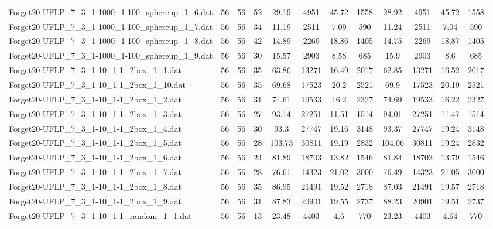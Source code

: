 \begin{sidewaystable}[!ht]
{\begin{tabular}{lccccccccccc}
Forget20-UFLP\_7\_3\_1-1000\_1-100\_sphereup\_1\_6.dat & 56 & 56 & 52 & 29.19 & 4951 & 45.72 & 1558 & 28.92 & 4951 & 45.72 & 1558 \\
Forget20-UFLP\_7\_3\_1-1000\_1-100\_sphereup\_1\_7.dat & 56 & 56 & 34 & 11.19 & 2511 & 7.09 & 590 & 11.24 & 2511 &  \textcolor{blue2}{7.04} & 590 \\
Forget20-UFLP\_7\_3\_1-1000\_1-100\_sphereup\_1\_8.dat & 56 & 56 & 42 & 14.89 & 2269 & 18.86 & 1405 &  \textcolor{blue2}{14.75} & 2269 & 18.87 & 1405 \\
Forget20-UFLP\_7\_3\_1-1000\_1-100\_sphereup\_1\_9.dat & 56 & 56 & 30 & 15.57 & 2903 &  \textcolor{blue2}{8.58} & 685 & 15.9 & 2903 & 8.6 & 685 \\
Forget20-UFLP\_7\_3\_1-10\_1-1\_2box\_1\_1.dat & 56 & 56 & 35 & 63.86 & 13271 &  \textcolor{blue2}{16.49} & 2017 & 62.85 & 13271 & 16.52 & 2017 \\
Forget20-UFLP\_7\_3\_1-10\_1-1\_2box\_1\_10.dat & 56 & 56 & 35 & 69.68 & 17523 & 20.2 & 2521 & 69.9 & 17523 & 20.19 & 2521 \\
Forget20-UFLP\_7\_3\_1-10\_1-1\_2box\_1\_2.dat & 56 & 56 & 31 & 74.61 & 19533 & 16.2 & 2327 & 74.69 & 19533 & 16.22 & 2327 \\
Forget20-UFLP\_7\_3\_1-10\_1-1\_2box\_1\_3.dat & 56 & 56 & 27 & 93.14 & 27251 & 11.51 & 1514 & 94.01 & 27251 &  \textcolor{blue2}{11.47} & 1514 \\
Forget20-UFLP\_7\_3\_1-10\_1-1\_2box\_1\_4.dat & 56 & 56 & 30 & 93.3 & 27747 &  \textcolor{blue2}{19.16} & 3148 & 93.37 & 27747 & 19.24 & 3148 \\
Forget20-UFLP\_7\_3\_1-10\_1-1\_2box\_1\_5.dat & 56 & 56 & 28 & 103.73 & 30811 &  \textcolor{blue2}{19.19} & 2832 & 104.06 & 30811 & 19.24 & 2832 \\
Forget20-UFLP\_7\_3\_1-10\_1-1\_2box\_1\_6.dat & 56 & 56 & 24 & 81.89 & 18703 & 13.82 & 1546 & 81.84 & 18703 &  \textcolor{blue2}{13.79} & 1546 \\
Forget20-UFLP\_7\_3\_1-10\_1-1\_2box\_1\_7.dat & 56 & 56 & 28 & 76.61 & 14323 & 21.02 & 3000 & 76.49 & 14323 & 21.05 & 3000 \\
Forget20-UFLP\_7\_3\_1-10\_1-1\_2box\_1\_8.dat & 56 & 56 & 35 & 86.95 & 21491 & 19.52 & 2718 & 87.03 & 21491 & 19.57 & 2718 \\
Forget20-UFLP\_7\_3\_1-10\_1-1\_2box\_1\_9.dat & 56 & 56 & 31 & 87.83 & 20901 & 19.55 & 2737 & 88.23 & 20901 &  \textcolor{blue2}{19.51} & 2737 \\
Forget20-UFLP\_7\_3\_1-10\_1-1\_random\_1\_1.dat & 56 & 56 & 13 & 23.48 & 4403 &  \textcolor{blue2}{4.6} & 770 & 23.23 & 4403 & 4.64 & 770 \\

\end{tabular}}
\end{sidewaystable}
